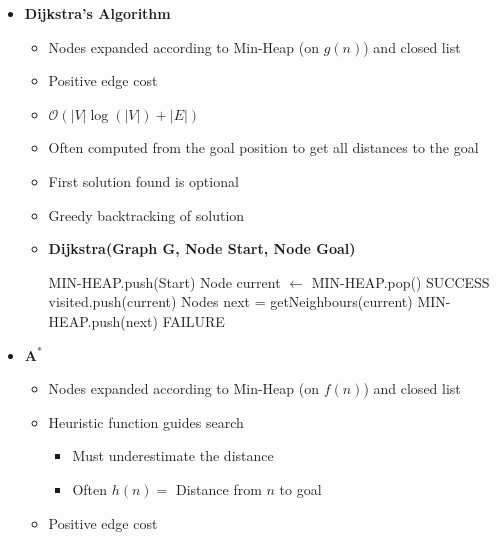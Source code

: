 \documentclass[a4paper]{article}
\newcommand{\ipro}{\item[+]}
\newcommand{\ides}[1]{\item \textbf{#1}}
\newcommand{\bigO}{\mathcal{O}}
\begin{document}
\begin{itemize}
\begin{itemize}
\begin{itemize}
                    \ides{DF:} Same as BF but using LIFO
                \end{itemize}
            \ides{Dijkstra's Algorithm}
                \begin{itemize}
                    \item Nodes expanded according to Min-Heap (on $g(n)$) and closed list
                    \item Positive edge cost
                    \item $\bigO(|V| \log(|V|) + |E|)$
                    \item Often computed from the goal position to get all distances to the goal
                    \ipro First solution found is optional
                    \item Greedy backtracking of solution
                    \ides{Dijkstra(Graph G, Node Start, Node Goal)}
                        \begin{algorithmic}
                            \STATE MIN-HEAP.push(Start)
                                \STATE Node current $\leftarrow$ MIN-HEAP.pop()
                                    \RETURN SUCCESS
                                \ENDIF
                                \STATE visited.push(current)
                                \STATE Nodes next = getNeighbours(current)
                                    \STATE MIN-HEAP.push(next)
                                \ENDFOR
                            \ENDWHILE
                            \RETURN FAILURE
                        \end{algorithmic}
                \end{itemize}
            \ides{$\mathbf{A^*}$}
                \begin{itemize}
                    \item Nodes expanded according to Min-Heap (on $f(n)$) and closed list
                    \item Heuristic function guides search
                        \begin{itemize}
                            \item Must underestimate the distance
                            \item Often $h(n) =$ Distance from $n$ to goal
                        \end{itemize}
                    \item Positive edge cost

\end{itemize}
\end{itemize}
\end{itemize}
\end{document}

